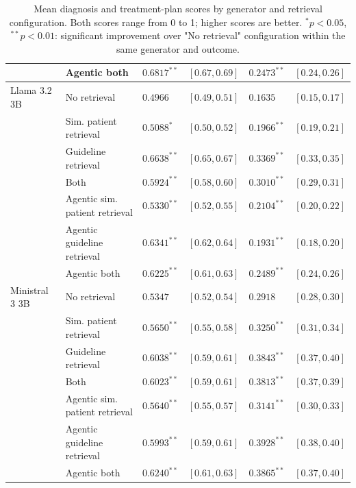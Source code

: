 \begin{table}[!b]
\begin{tabular*}{\textwidth}{@{\extracolsep{\fill}}lllclc@{}}
 & Agentic both & $0.6817^{**}$ & {\scriptsize $[0.67, 0.69]$} & $0.2473^{**}$ & {\scriptsize $[0.24, 0.26]$} \\
\midrule
Llama 3.2 3B & No retrieval & $0.4966$ & {\scriptsize $[0.49, 0.51]$} & $0.1635$ & {\scriptsize $[0.15, 0.17]$} \\[2pt]
 & Sim. patient retrieval & $0.5088^{*}$ & {\scriptsize $[0.50, 0.52]$} & $0.1966^{**}$ & {\scriptsize $[0.19, 0.21]$} \\
 & Guideline retrieval & $\mathbf{0.6638}^{**}$ & {\scriptsize $[0.65, 0.67]$} & $\mathbf{0.3369}^{**}$ & {\scriptsize $[0.33, 0.35]$} \\
 & Both & $0.5924^{**}$ & {\scriptsize $[0.58, 0.60]$} & $0.3010^{**}$ & {\scriptsize $[0.29, 0.31]$} \\
 & Agentic sim. patient retrieval & $0.5330^{**}$ & {\scriptsize $[0.52, 0.55]$} & $0.2104^{**}$ & {\scriptsize $[0.20, 0.22]$} \\
 & Agentic guideline retrieval & $0.6341^{**}$ & {\scriptsize $[0.62, 0.64]$} & $0.1931^{**}$ & {\scriptsize $[0.18, 0.20]$} \\
 & Agentic both & $0.6225^{**}$ & {\scriptsize $[0.61, 0.63]$} & $0.2489^{**}$ & {\scriptsize $[0.24, 0.26]$} \\
\midrule
Ministral 3 3B & No retrieval & $0.5347$ & {\scriptsize $[0.52, 0.54]$} & $0.2918$ & {\scriptsize $[0.28, 0.30]$} \\[2pt]
 & Sim. patient retrieval & $0.5650^{**}$ & {\scriptsize $[0.55, 0.58]$} & $0.3250^{**}$ & {\scriptsize $[0.31, 0.34]$} \\
 & Guideline retrieval & $0.6038^{**}$ & {\scriptsize $[0.59, 0.61]$} & $0.3843^{**}$ & {\scriptsize $[0.37, 0.40]$} \\
 & Both & $0.6023^{**}$ & {\scriptsize $[0.59, 0.61]$} & $0.3813^{**}$ & {\scriptsize $[0.37, 0.39]$} \\
 & Agentic sim. patient retrieval & $0.5640^{**}$ & {\scriptsize $[0.55, 0.57]$} & $0.3141^{**}$ & {\scriptsize $[0.30, 0.33]$} \\
 & Agentic guideline retrieval & $0.5993^{**}$ & {\scriptsize $[0.59, 0.61]$} & $\mathbf{0.3928}^{**}$ & {\scriptsize $[0.38, 0.40]$} \\
 & Agentic both & $\mathbf{0.6240}^{**}$ & {\scriptsize $[0.61, 0.63]$} & $0.3865^{**}$ & {\scriptsize $[0.37, 0.40]$} \\
\bottomrule
\end{tabular*}
\captionsetup{justification=raggedright,singlelinecheck=false}
\caption{Mean diagnosis and treatment-plan scores by generator and retrieval configuration. Both scores range from 0 to 1; higher scores are better. $^{*}p<0.05$, $^{**}p<0.01$: significant improvement over "No retrieval" configuration within the same generator and outcome.}
\label{tab:main-results}
\end{table}
